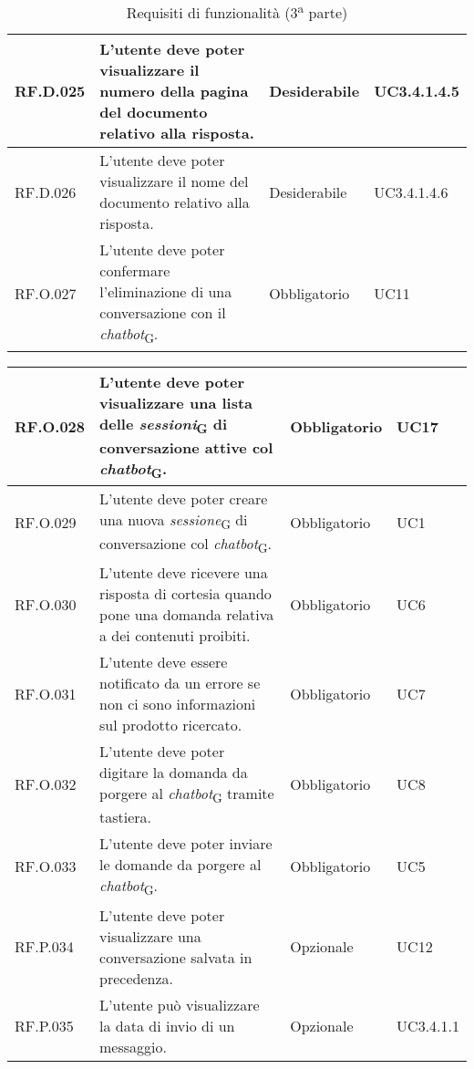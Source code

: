 \begin{table}[H]
\begin{tabular}{|C{2.7cm}|L{6.5cm}|C{2.7cm}|C{2.7cm}|}
         \hline
        RF.D.025 & L’utente deve poter visualizzare il numero della pagina del documento relativo alla risposta.
        & Desiderabile & UC3.4.1.4.5 \\
        \hline
        RF.D.026 & L’utente deve poter visualizzare il nome del documento relativo alla
        risposta.
         & Desiderabile & UC3.4.1.4.6 \\
        \hline
        RF.O.027 & L’utente deve poter confermare l'eliminazione di una conversazione con il \textit{chatbot}\textsubscript{G}.
         & Obbligatorio & UC11 \\
        \hline
    \end{tabular}
    \caption{Requisiti di funzionalità (3\textsuperscript{a}  parte)}
\end{table}
\begin{table}[H]
\centering
    \begin{tabular}{|C{2.7cm}|L{6.5cm}|C{2.7cm}|C{2.7cm}|}
        \hline
        RF.O.028 & L’utente deve poter visualizzare una lista delle
        \textit{sessioni}\textsubscript{G} di conversazione attive col \textit{chatbot}\textsubscript{G}.
         & Obbligatorio & UC17 \\
        \hline
        RF.O.029 & L’utente deve poter creare una nuova \textit{sessione}\textsubscript{G} di conversazione col \textit{chatbot}\textsubscript{G}.
         & Obbligatorio & UC1 \\
        \hline
        RF.O.030 & L’utente deve ricevere una risposta di cortesia quando pone una domanda relativa a dei contenuti proibiti.
         & Obbligatorio & UC6 \\
        \hline
        RF.O.031 & L'utente deve essere notificato da un errore se non ci sono informazioni sul prodotto ricercato. & Obbligatorio & UC7 \\
        \hline
        RF.O.032 & L’utente deve poter digitare la domanda da porgere al \textit{chatbot}\textsubscript{G} tramite tastiera.
         & Obbligatorio & UC8 \\
        \hline
        RF.O.033 & L’utente deve poter inviare le domande da porgere al \textit{chatbot}\textsubscript{G}.
         & Obbligatorio & UC5 \\
        \hline
        RF.P.034 & L’utente deve poter visualizzare una conversazione salvata in precedenza.
         & Opzionale & UC12 \\
        \hline
        RF.P.035 & L’utente può visualizzare la data di invio di un messaggio.
         & Opzionale & UC3.4.1.1 \\

\end{tabular}
\end{table}
